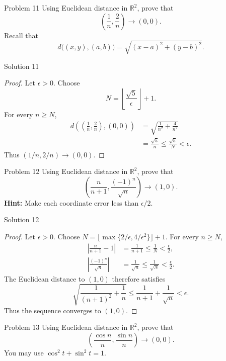 \documentclass{beamer}
\begin{document}
\begin{frame}{Problem 11}
Using Euclidean distance in $\mathbb R^2$, prove that
\[
  \left(\frac{1}{n},\frac{2}{n}\right)\longrightarrow(0,0).
\]
Recall that
\[
  d\bigl((x,y),(a,b)\bigr)
  =\sqrt{(x-a)^2+(y-b)^2}.
\]
\end{frame}

\begin{frame}{Solution 11}
\begin{proof}
Let $\epsilon>0$. Choose
\[
  N=\left\lfloor\frac{\sqrt{5}}{\epsilon}\right\rfloor+1.
\]
For every $n\geq N$,
\[
\begin{aligned}
  d\left(\left(\frac{1}{n},\frac{2}{n}\right),(0,0)\right)
  &=\sqrt{\frac{1}{n^2}+\frac{4}{n^2}}\\
  &=\frac{\sqrt{5}}{n}\leq\frac{\sqrt{5}}{N}<\epsilon.
\end{aligned}
\]
Thus $(1/n,2/n)\to(0,0)$.
\end{proof}
\end{frame}

\begin{frame}{Problem 12}
Using Euclidean distance in $\mathbb R^2$, prove that
\[
  \left(\frac{n}{n+1},\frac{(-1)^n}{\sqrt{n}}\right)
  \longrightarrow(1,0).
\]
\textbf{Hint:} Make each coordinate error less than $\epsilon/2$.
\end{frame}

\begin{frame}{Solution 12}
\begin{proof}
Let $\epsilon>0$. Choose
$N=\lfloor\max\{2/\epsilon,4/\epsilon^2\}\rfloor+1$.
For every $n\geq N$,
\[
\begin{aligned}
  \left\lvert\frac{n}{n+1}-1\right\rvert
  &=\frac{1}{n+1}\leq\frac{1}{N}<\frac{\epsilon}{2},\\
  \left\lvert\frac{(-1)^n}{\sqrt{n}}\right\rvert
  &=\frac{1}{\sqrt{n}}\leq\frac{1}{\sqrt{N}}<\frac{\epsilon}{2}.
\end{aligned}
\]
The Euclidean distance to $(1,0)$ therefore satisfies
\[
  \sqrt{\frac{1}{(n+1)^2}+\frac{1}{n}}
  \leq\frac{1}{n+1}+\frac{1}{\sqrt{n}}<\epsilon.
\]
Thus the sequence converges to $(1,0)$.
\end{proof}
\end{frame}

\begin{frame}{Problem 13}
Using Euclidean distance in $\mathbb R^2$, prove that
\[
  \left(\frac{\cos n}{n},\frac{\sin n}{n}\right)
  \longrightarrow(0,0).
\]
You may use $\cos^2t+\sin^2t=1$.
\end{frame}
\end{document}

